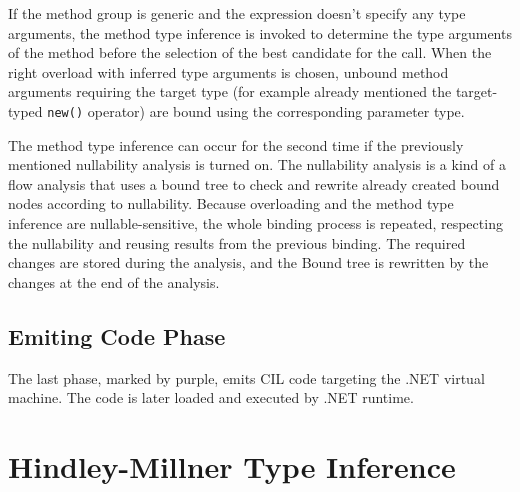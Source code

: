 If the method group is generic and the expression doesn’t specify any type arguments, the method type inference is invoked to determine the type arguments of the method before the selection of the best candidate for the call.
When the right overload with inferred type arguments is chosen, unbound method arguments requiring the target type (for example already mentioned the target-typed \texttt{new()} operator) are bound using the corresponding parameter type.
\par
The method type inference can occur for the second time if the previously mentioned nullability analysis is turned on. 
The nullability analysis is a kind of a flow analysis that uses a bound tree to check and rewrite already created bound nodes according to nullability. 
Because overloading and the method type inference are nullable-sensitive, the whole binding process is repeated, respecting the nullability and reusing results from the previous binding. 
The required changes are stored during the analysis, and the Bound tree is rewritten by the changes at the end of the analysis.

\subsection{Emiting Code Phase}

The last phase, marked by purple, emits \ac{CIL} code targeting the .NET virtual machine.
The code is later loaded and executed by .NET runtime.

\section{Hindley-Millner Type Inference} \label{sect03:HM}

